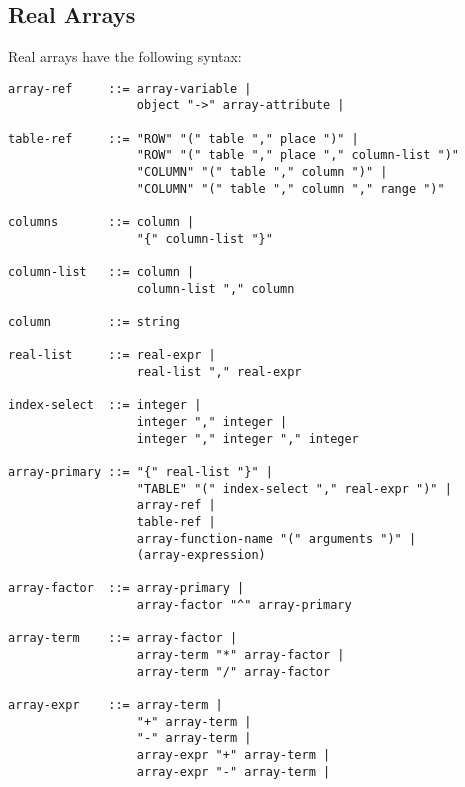 \subsection{Real Arrays}
\label{sec:realarray}
Real arrays have the following syntax:
\begin{verbatim}
array-ref     ::= array-variable |
                  object "->" array-attribute |

table-ref     ::= "ROW" "(" table "," place ")" |
                  "ROW" "(" table "," place "," column-list ")"
                  "COLUMN" "(" table "," column ")" |
                  "COLUMN" "(" table "," column "," range ")"

columns       ::= column |
                  "{" column-list "}"

column-list   ::= column |
                  column-list "," column

column        ::= string

real-list     ::= real-expr |
                  real-list "," real-expr

index-select  ::= integer |
                  integer "," integer |
                  integer "," integer "," integer

array-primary ::= "{" real-list "}" |
                  "TABLE" "(" index-select "," real-expr ")" |
                  array-ref |
                  table-ref |
                  array-function-name "(" arguments ")" |
                  (array-expression)

array-factor  ::= array-primary |
                  array-factor "^" array-primary

array-term    ::= array-factor |
                  array-term "*" array-factor |
                  array-term "/" array-factor

array-expr    ::= array-term |
                  "+" array-term |
                  "-" array-term |
                  array-expr "+" array-term |
                  array-expr "-" array-term |
\end{verbatim}

